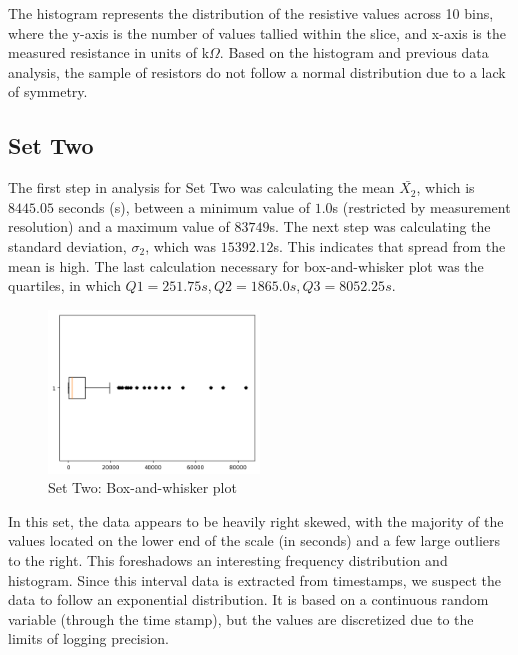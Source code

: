 \documentclass[10pt]{report}
\begin{document}
The histogram represents the distribution of the resistive values across 10 bins, where the y-axis 
is the number of values tallied within the slice, and x-axis is the measured resistance in units of k$\Omega$.
Based on the histogram and previous data analysis, the sample of resistors do not follow a
normal distribution due to a lack of symmetry.



\subsection*{Set Two}

The first step in analysis for Set Two was calculating the mean $\bar{X_2}$, which is $8445.05$ seconds (s),
between a minimum value of $1.0$s (restricted by measurement resolution) and a maximum value of $83749$s. 
The next step was calculating the standard deviation, $\sigma_2$, which was $15392.12$s. 
This indicates that spread from the mean is high. The last calculation necessary for box-and-whisker plot was the quartiles,
in which $Q1 = 251.75s, Q2 = 1865.0s, Q3 = 8052.25s$.

\begin{figure}
    \centering
    \includegraphics[width=0.50\textwidth]{results/logininterval_boxplot}
    \caption{Set Two: Box-and-whisker plot}
\end{figure}

In this set, the data appears to be heavily right skewed, with the majority of the values located on the lower
end of the scale (in seconds) and a few large outliers to the right. This foreshadows an interesting frequency
distribution and histogram. Since this interval data is extracted from timestamps, we suspect the data to follow an
exponential distribution. It is based on a continuous random variable (through the time stamp), but the values are
discretized due to the limits of logging precision.
\end{document}
